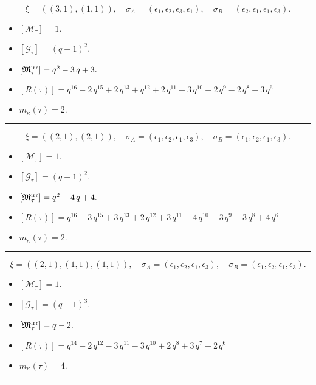 \documentclass[10pt,a4paper]{amsart}
\begin{document}
$$\xi = ({(3, 1), (1, 1)}),\quad \sigma_A = ({{\epsilon_1, \epsilon_2, \epsilon_3}, {\epsilon_1}}),\quad \sigma_B = ({{\epsilon_2, \epsilon_1, \epsilon_1}, {\epsilon_3}}).$$

\begin{itemize}
 \item $[\mathcal{M}_{\tau}] = 1 .$

 \item $[\mathcal{G}_{\tau}] = {\left(q - 1\right)}^{2} .$

 \item $[{\frak M}_{\tau}^{\textrm{irr}}] = q^{2} - 3 \, q + 3 .$

 \item $[R(\tau)] = q^{16} - 2 \, q^{15} + 2 \, q^{13} + q^{12} + 2 \, q^{11} - 3 \, q^{10} - 2 \, q^{9} - 2 \, q^{8} + 3 \, q^{6} $

 \item $m_{\kappa}(\tau) = 2 .$

 \end{itemize}
\noindent\rule{8cm}{0.4pt}

$$\xi = ({(2, 1), (2, 1)}),\quad \sigma_A = ({{\epsilon_1, \epsilon_2}, {\epsilon_1, \epsilon_3}}),\quad \sigma_B = ({{\epsilon_1, \epsilon_2}, {\epsilon_1, \epsilon_3}}).$$

\begin{itemize}
 \item $[\mathcal{M}_{\tau}] = 1 .$

 \item $[\mathcal{G}_{\tau}] = {\left(q - 1\right)}^{2} .$

 \item $[{\frak M}_{\tau}^{\textrm{irr}}] = q^{2} - 4 \, q + 4 .$

 \item $[R(\tau)] = q^{16} - 3 \, q^{15} + 3 \, q^{13} + 2 \, q^{12} + 3 \, q^{11} - 4 \, q^{10} - 3 \, q^{9} - 3 \, q^{8} + 4 \, q^{6} $

 \item $m_{\kappa}(\tau) = 2 .$

 \end{itemize}
\noindent\rule{8cm}{0.4pt}

$$\xi = ({(2, 1), (1, 1), (1, 1)}),\quad \sigma_A = ({{\epsilon_1, \epsilon_2}, {\epsilon_1}, {\epsilon_3}}),\quad \sigma_B = ({{\epsilon_1, \epsilon_2}, {\epsilon_1}, {\epsilon_3}}).$$

\begin{itemize}
 \item $[\mathcal{M}_{\tau}] = 1 .$

 \item $[\mathcal{G}_{\tau}] = {\left(q - 1\right)}^{3} .$

 \item $[{\frak M}_{\tau}^{\textrm{irr}}] = q - 2 .$

 \item $[R(\tau)] = q^{14} - 2 \, q^{12} - 3 \, q^{11} - 3 \, q^{10} + 2 \, q^{8} + 3 \, q^{7} + 2 \, q^{6} $

 \item $m_{\kappa}(\tau) = 4 .$

 \end{itemize}
\noindent\rule{8cm}{0.4pt}
\end{document}
